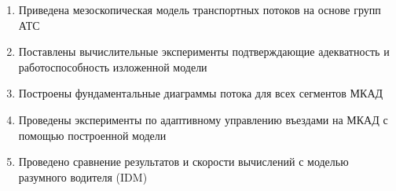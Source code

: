\begin{enumerate}
  \item Приведена мезоскопическая модель транспортных потоков на основе групп АТС
  \item Поставлены вычислительные эксперименты подтверждающие адекватность и работоспособность изложенной модели
  \item Построены фундаментальные диаграммы потока для всех сегментов МКАД
  \item Проведены эксперименты по адаптивному управлению въездами на МКАД с помощью построенной модели
  \item Проведено сравнение результатов и скорости вычислений с моделью разумного водителя (IDM)
\end{enumerate}
